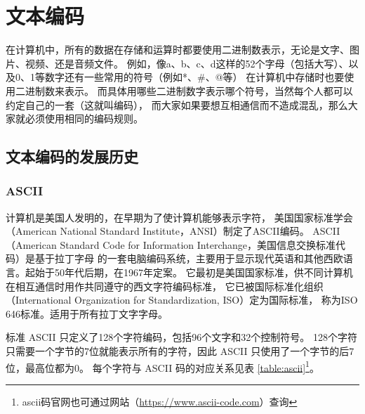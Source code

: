 \section{文本编码}
在计算机中，所有的数据在存储和运算时都要使用二进制数表示，无论是文字、图片、视频、还是音频文件。
例如，像a、b、c、d这样的52个字母（包括大写）、以及0、1等数字还有一些常用的符号（例如*、\#、@等）
在计算机中存储时也要使用二进制数来表示。
而具体用哪些二进制数字表示哪个符号，当然每个人都可以约定自己的一套（这就叫编码），
而大家如果要想互相通信而不造成混乱，那么大家就必须使用相同的编码规则。

\subsection{文本编码的发展历史}

\subsubsection{ASCII}
计算机是美国人发明的，在早期为了使计算机能够表示字符，
美国国家标准学会（American National Standard Institute，ANSI）制定了ASCII编码。
ASCII（American Standard Code for Information Interchange，美国信息交换标准代码）是基于拉丁字母
的一套电脑编码系统，主要用于显示现代英语和其他西欧语言。起始于50年代后期，在1967年定案。
它最初是美国国家标准，供不同计算机在相互通信时用作共同遵守的西文字符编码标准，
它已被国际标准化组织（International Organization for Standardization, ISO）定为国际标准，
称为ISO 646标准。适用于所有拉丁文字字母。

标准 ASCII 只定义了128个字符编码，包括96个文字和32个控制符号。
128个字符只需要一个字节的7位就能表示所有的字符，因此 ASCII 只使用了一个字节的后7位，最高位都为0。
每个字符与 ASCII 码的对应关系见表 \ref{table:ascii}\footnote{ascii码官网也可通过网站（\url{https://www.ascii-code.com}）查询}。

